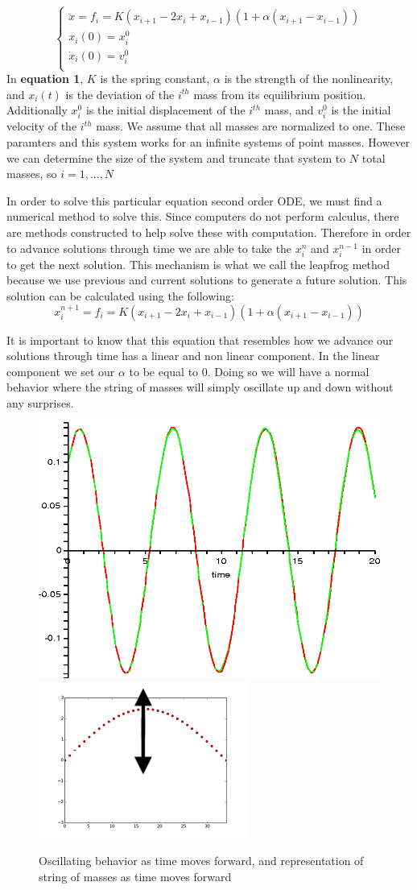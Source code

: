 \begin{equation}
\label{FPUT system of ODE's}
\begin{cases}
\ddot{x} = f_{i} = K(x_{i+1}-2x_{i}+x_{i-1})(1+\alpha(x_{i+1}-x_{i-1}))\\
x_{i}(0) = x_{i}^{0}\\
\dot{x}_{i}(0) = v_{i}^{0}\\
\end{cases}
\end{equation}
In \textbf{equation 1}, $K$ is the spring constant, $\alpha$ is the strength of the nonlinearity, and $x_{i}(t)$ is the deviation of the $i^{th}$ mass from its equilibrium position. Additionally $x_{i}^{0}$ is the initial displacement of the $i^{th}$ mass, and $v_{i}^{0}$ is the initial velocity of the $i^{th}$ mass. We assume that all masses are normalized to one. These paramters and this system works for an infinite systems of point masses. However we can determine the size of the system and truncate that system to $N$ total masses, so $i=1,...,N$

In order to solve this particular equation second order ODE, we must find a numerical method to solve this. Since computers do not perform calculus, there are methods constructed to help solve these with computation. Therefore in order to advance solutions through time we are able to take the $x^{n}_{i}$ and $x^{n-1}_{i}$ in order to get the next solution. This mechanism is what we call the leapfrog method because we use previous and current solutions to generate a future solution. This solution can be calculated using the following:  $${x}^{n+1}_{i} = f_{i} = K(x_{i+1}-2x_{i}+x_{i-1})(1+\alpha(x_{i+1}-x_{i-1}))$$

It is important to know that this equation that resembles how we advance our solutions through time has a linear and non linear component. In the linear component we set our $\alpha$ to be equal to 0. Doing so we will have a normal behavior where the string of masses will simply oscillate up and down without any surprises. 
\begin{figure}[H]
\centering
\includegraphics[width=.35\textwidth]{figures/osc-time.png}
\includegraphics[width=.35\textwidth]{figures/msl.png}
\caption{Oscillating behavior as time moves forward, and representation of string of masses as time moves forward}
\end{figure}

